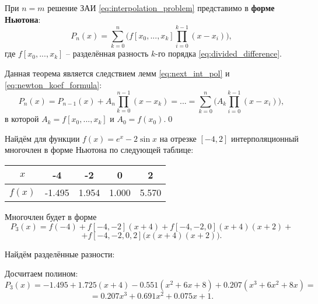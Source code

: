 \documentclass[../main.tex]{subfile}
\begin{document}
\begin{theorem}\label{eq:newton_polynomial}
	При $n=m$ решение ЗАИ \eqref{eq:interpolation_problem} представимо в
	\textbf{форме Ньютона}:
	\[\boxed{P_n(x)=\sum_{k=0}^{n}\big(f[x_0,...,x_k]\prod_{i=0}^{k-1}
	(x-x_i)\big)},\]
	где $f[x_0,...,x_k]$ -- разделённая разность $k$-го порядка
	\eqref{eq:divided_difference}.
\end{theorem}

\beginproof

	Данная теорема является следствием лемм \eqref{eq:next_int_pol} и
	\eqref{eq:newton_koef_formula}:
	\[P_n(x)=P_{n-1}(x)+A_n\prod_{k=0}^{n-1}(x-x_k)=...=
	\sum_{k=0}^{n}\big(A_k\prod_{i=0}^{k-1}(x-x_i)\big),\]
	в которой $A_k=f[x_0,...,x_k]$ и $A_0=f(x_0)$.\qed

\begin{example}\label{eq:newton_polynomial_example}
	Найдём для функции $f(x)=e^x-2\sin x$ на отрезке $[-4,2]$
	интерполяционный многочлен в форме Ньютона по следующей таблице:

	\begin{tabular}{|c|c|c|c|c|}
		\hline
		$x$	& -4	& -2	& 0	& 2	\\
		\hline
		$f(x)$	&-1.495	& 1.954	& 1.000	& 5.570	\\
		\hline
	\end{tabular}

	Многочлен будет в форме
	\[P_3(x)=f(-4)+f[-4,-2](x+4)+f[-4,-2,0](x+4)(x+2)+\]
	\[+f[-4,-2,0,2]\big(x(x+4)(x+2)\big).\]

	Найдём разделённые разности:

	\begin{table}[h]
		\centering
	\end{table}
	Досчитаем полином:
	\[P_3(x)=-1.495+1.725(x+4)-0.551(x^2+6x+8)+0.207(x^3+6x^2+8x)=\]
	\[=0.207x^3+0.691x^2+0.075x+1.\]
	\newpage


\end{example}
\end{document}
